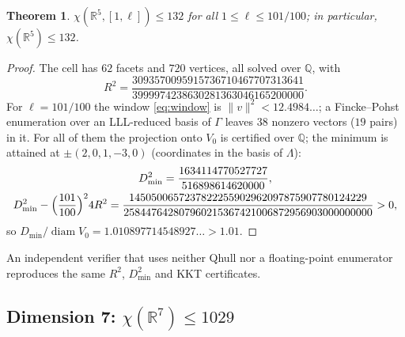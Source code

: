 \documentclass[10pt]{article}
\theoremstyle{plain}
\newtheorem{theorem}{Theorem}[section]
\theoremstyle{remark}
\newcommand{\R}{\mathbb{R}}
\newcommand{\Q}{\mathbb{Q}}
\newcommand{\diam}{\operatorname{diam}}
\begin{document}
\begin{theorem}\label{thm:132}
$\chi(\R^5,[1,\ell])\le132$ for all $1\le\ell\le101/100$; in particular,
$\chi(\R^5)\le132$.
\end{theorem}

\begin{proof}
The cell has $62$ facets and $720$ vertices, all solved over $\Q$, with
\[
R^2=\frac{3093570095915736710467707313641}{3999974238630281363046165200000}.
\]
For $\ell=101/100$ the window \eqref{eq:window} is $\|v\|^2<12.4984\ldots$;
a Fincke--Pohst enumeration over an LLL-reduced basis of $\Gamma$ leaves
$38$ nonzero vectors ($19$ pairs) in it. For all of them the projection onto
$V_0$ is certified over $\Q$; the minimum is attained at
$\pm(2,0,1,-3,0)$ (coordinates in the basis of $\Lambda$):
\begin{gather*}
D_{\min}^2=\frac{1634114770527727}{516898614620000},\\
D_{\min}^2-\Bigl(\frac{101}{100}\Bigr)^2 4R^2
=\frac{1450500657237822255902962097875907780124229}
{258447642807960215367421006872956903000000000}>0 ,
\end{gather*}
so $D_{\min}/\diam V_0=1.010897714548927\ldots>1.01$.
\end{proof}

An independent verifier that uses neither Qhull nor a floating-point
enumerator reproduces the same $R^2$, $D_{\min}^2$ and KKT certificates.

\subsection{Dimension 7: $\chi(\R^7)\le1029$}\label{ssec:1029}
\end{document}
